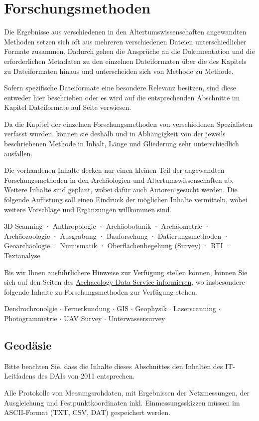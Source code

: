 \chapter{Forschungsmethoden}
	\label{methoden}
Die Ergebnisse aus verschiedenen in den Altertumswissenschaften angewandten Methoden setzen sich oft aus mehreren verschiedenen Dateien unterschiedlicher Formate zusammen. Dadurch gehen die Ansprüche an die Dokumentation und die erforderlichen Metadaten zu den einzelnen Dateiformaten über die des Kapitels zu Dateiformaten hinaus und unterscheiden sich von Methode zu Methode. 

Sofern spezifische Dateiformate eine besondere Relevanz besitzen, sind diese entweder hier beschrieben oder es wird auf die entsprechenden Abschnitte im Kapitel Dateiformate auf Seite \pageref{dateiformate} verwiesen.

Da die Kapitel der einzelnen Forschungsmethoden von verschiedenen Spezialisten verfasst wurden, können sie deshalb und in Abhängigkeit von der jeweils beschriebenen Methode in Inhalt, Länge und Gliederung sehr unterschiedlich ausfallen.

Die vorhandenen Inhalte decken nur einen kleinen Teil der angewandten Forschungsmethoden in den Archäologien und Altertumswissenschaften ab. Weitere Inhalte sind geplant, wobei dafür auch Autoren gesucht werden. Die folgende Auflistung soll einen Eindruck der möglichen Inhalte vermitteln, wobei weitere Vorschläge und Ergänzungen willkommen sind.

3D-Scanning · Anthropologie · Archäobotanik · Archäometrie · Archäozoologie · Ausgrabung · Bauforschung · Datierungsmethoden · Geoarchäologie · Numismatik · Oberflächenbegehung (Survey) · RTI · Textanalyse

Bis wir Ihnen ausführlichere Hinweise zur Verfügung stellen können, können Sie sich auf den Seiten des \href{http://guides.archaeologydataservice.ac.uk/g2gp}{Archaeology Data Service informieren}, wo insbesondere folgende Inhalte zu Forschungsmethoden zur Verfügung stehen.

Dendrochronolgie $\cdot$ Fernerkundung $\cdot$ GIS $\cdot$ Geophysik $\cdot$ Laserscanning $\cdot$ Photogrammetrie $\cdot$ UAV Survey $\cdot$ Unterwassersurvey

\section{Geodäsie}
Bitte beachten Sie, dass die Inhalte dieses Abschnittes den Inhalten des IT-Leitfadens des DAIs von 2011 entsprechen.
\begin{center}
\tib{\rule{0.9\textwidth}{0.2mm}}\vspace{3mm}
\end{center}
Alle Protokolle von Messungsrohdaten, mit Ergebnissen der Netzmessungen, der Ausgleichung und Festpunktkoordinaten inkl. Einmessungsskizzen müssen im \gls{ASCII}-Format (\gls{TXT}, \gls{CSV}, DAT) gespeichert werden.
	

